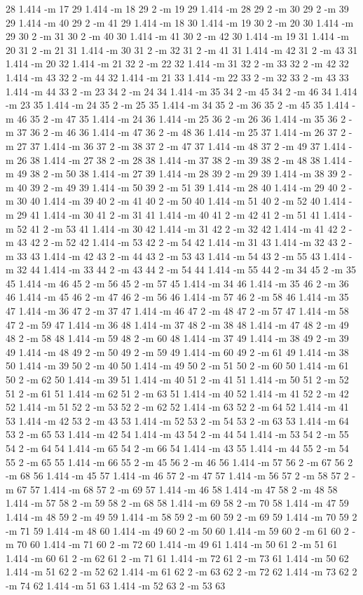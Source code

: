 \documentclass[12pt]{article}
\begin{document}
28 1.414 -m 17 29 1.414 -m 18 29 2 -m 19 29 1.414 -m 28 29 2 -m 30 29 2 -m 39 29 1.414 -m 40 29 2 -m 41 29 1.414 -m 18 30 1.414 -m 19 30 2 -m 20 30 1.414 -m 29 30 2 -m 31 30 2 -m 40 30 1.414 -m 41 30 2 -m 42 30 1.414 -m 19 31 1.414 -m 20 31 2 -m 21 31 1.414 -m 30 31 2 -m 32 31 2 -m 41 31 1.414 -m 42 31 2 -m 43 31 1.414 -m 20 32 1.414 -m 21 32 2 -m 22 32 1.414 -m 31 32 2 -m 33 32 2 -m 42 32 1.414 -m 43 32 2 -m 44 32 1.414 -m 21 33 1.414 -m 22 33 2 -m 32 33 2 -m 43 33 1.414 -m 44 33 2 -m 23 34 2 -m 24 34 1.414 -m 35 34 2 -m 45 34 2 -m 46 34 1.414 -m 23 35 1.414 -m 24 35 2 -m 25 35 1.414 -m 34 35 2 -m 36 35 2 -m 45 35 1.414 -m 46 35 2 -m 47 35 1.414 -m 24 36 1.414 -m 25 36 2 -m 26 36 1.414 -m 35 36 2 -m 37 36 2 -m 46 36 1.414 -m 47 36 2 -m 48 36 1.414 -m 25 37 1.414 -m 26 37 2 -m 27 37 1.414 -m 36 37 2 -m 38 37 2 -m 47 37 1.414 -m 48 37 2 -m 49 37 1.414 -m 26 38 1.414 -m 27 38 2 -m 28 38 1.414 -m 37 38 2 -m 39 38 2 -m 48 38 1.414 -m 49 38 2 -m 50 38 1.414 -m 27 39 1.414 -m 28 39 2 -m 29 39 1.414 -m 38 39 2 -m 40 39 2 -m 49 39 1.414 -m 50 39 2 -m 51 39 1.414 -m 28 40 1.414 -m 29 40 2 -m 30 40 1.414 -m 39 40 2 -m 41 40 2 -m 50 40 1.414 -m 51 40 2 -m 52 40 1.414 -m 29 41 1.414 -m 30 41 2 -m 31 41 1.414 -m 40 41 2 -m 42 41 2 -m 51 41 1.414 -m 52 41 2 -m 53 41 1.414 -m 30 42 1.414 -m 31 42 2 -m 32 42 1.414 -m 41 42 2 -m 43 42 2 -m 52 42 1.414 -m 53 42 2 -m 54 42 1.414 -m 31 43 1.414 -m 32 43 2 -m 33 43 1.414 -m 42 43 2 -m 44 43 2 -m 53 43 1.414 -m 54 43 2 -m 55 43 1.414 -m 32 44 1.414 -m 33 44 2 -m 43 44 2 -m 54 44 1.414 -m 55 44 2 -m 34 45 2 -m 35 45 1.414 -m 46 45 2 -m 56 45 2 -m 57 45 1.414 -m 34 46 1.414 -m 35 46 2 -m 36 46 1.414 -m 45 46 2 -m 47 46 2 -m 56 46 1.414 -m 57 46 2 -m 58 46 1.414 -m 35 47 1.414 -m 36 47 2 -m 37 47 1.414 -m 46 47 2 -m 48 47 2 -m 57 47 1.414 -m 58 47 2 -m 59 47 1.414 -m 36 48 1.414 -m 37 48 2 -m 38 48 1.414 -m 47 48 2 -m 49 48 2 -m 58 48 1.414 -m 59 48 2 -m 60 48 1.414 -m 37 49 1.414 -m 38 49 2 -m 39 49 1.414 -m 48 49 2 -m 50 49 2 -m 59 49 1.414 -m 60 49 2 -m 61 49 1.414 -m 38 50 1.414 -m 39 50 2 -m 40 50 1.414 -m 49 50 2 -m 51 50 2 -m 60 50 1.414 -m 61 50 2 -m 62 50 1.414 -m 39 51 1.414 -m 40 51 2 -m 41 51 1.414 -m 50 51 2 -m 52 51 2 -m 61 51 1.414 -m 62 51 2 -m 63 51 1.414 -m 40 52 1.414 -m 41 52 2 -m 42 52 1.414 -m 51 52 2 -m 53 52 2 -m 62 52 1.414 -m 63 52 2 -m 64 52 1.414 -m 41 53 1.414 -m 42 53 2 -m 43 53 1.414 -m 52 53 2 -m 54 53 2 -m 63 53 1.414 -m 64 53 2 -m 65 53 1.414 -m 42 54 1.414 -m 43 54 2 -m 44 54 1.414 -m 53 54 2 -m 55 54 2 -m 64 54 1.414 -m 65 54 2 -m 66 54 1.414 -m 43 55 1.414 -m 44 55 2 -m 54 55 2 -m 65 55 1.414 -m 66 55 2 -m 45 56 2 -m 46 56 1.414 -m 57 56 2 -m 67 56 2 -m 68 56 1.414 -m 45 57 1.414 -m 46 57 2 -m 47 57 1.414 -m 56 57 2 -m 58 57 2 -m 67 57 1.414 -m 68 57 2 -m 69 57 1.414 -m 46 58 1.414 -m 47 58 2 -m 48 58 1.414 -m 57 58 2 -m 59 58 2 -m 68 58 1.414 -m 69 58 2 -m 70 58 1.414 -m 47 59 1.414 -m 48 59 2 -m 49 59 1.414 -m 58 59 2 -m 60 59 2 -m 69 59 1.414 -m 70 59 2 -m 71 59 1.414 -m 48 60 1.414 -m 49 60 2 -m 50 60 1.414 -m 59 60 2 -m 61 60 2 -m 70 60 1.414 -m 71 60 2 -m 72 60 1.414 -m 49 61 1.414 -m 50 61 2 -m 51 61 1.414 -m 60 61 2 -m 62 61 2 -m 71 61 1.414 -m 72 61 2 -m 73 61 1.414 -m 50 62 1.414 -m 51 62 2 -m 52 62 1.414 -m 61 62 2 -m 63 62 2 -m 72 62 1.414 -m 73 62 2 -m 74 62 1.414 -m 51 63 1.414 -m 52 63 2 -m 53 63 
\end{document}
